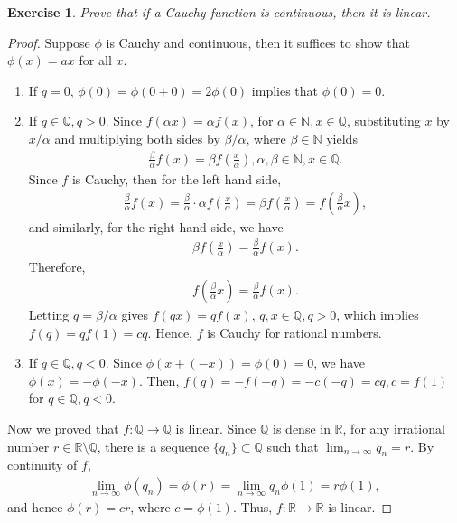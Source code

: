 \documentclass[11pt]{book}
\newtheorem{exercise}{Exercise}[section]
\theoremstyle{definition}
\numberwithin{equation}{chapter}
\begin{document}
\begin{exercise}\label{exercise_529}
Prove that if a Cauchy function is continuous, then it is linear.
\end{exercise}
\begin{proof}
Suppose $\phi$ is Cauchy and continuous, then it suffices to show that $\phi(x) = ax$ for all $x$. 
\begin{enumerate}[label=(\alph*)]
    \item If $q = 0$, $\phi(0) = \phi(0 + 0) = 2 \phi(0)$ implies that $\phi(0) = 0$.
    
    \item If $q \in \mathbb{Q}, q > 0$. Since $f(\alpha x) = \alpha f(x)$, for $\alpha \in \mathbb{N}, x \in \mathbb{Q}$, substituting $x$ by $x/\alpha$ and multiplying both sides by $\beta/\alpha$, where $\beta \in \mathbb{N}$ yields
    \begin{align*}
        \frac{\beta}{\alpha} f(x) = \beta f\left(\frac{x}{\alpha}\right), \alpha,\beta \in \mathbb{N}, x \in \mathbb{Q}.
    \end{align*}
    Since $f$ is Cauchy, then for the left hand side, \begin{align*}
        \frac{\beta}{\alpha} f(x) = \frac{\beta}{\alpha} \cdot \alpha f\left(\frac{x}{\alpha}\right) = \beta f\left(\frac{x}{\alpha}\right) = f\left(\frac{\beta}{\alpha} x\right),
    \end{align*}
    and similarly, for the right hand side, we have
    \begin{align*}
        \beta f\left(\frac{x}{\alpha}\right) = \frac{\beta}{\alpha} f(x).
    \end{align*}
    Therefore,
    \begin{align*}
        f\left(\frac{\beta}{\alpha} x\right) = \frac{\beta}{\alpha} f(x).
    \end{align*}
    Letting $q = \beta/\alpha$ gives $f(qx) = qf(x)$, $q, x \in \mathbb{Q}, q > 0$, which implies $f(q) = qf(1) = cq$. Hence, $f$ is Cauchy for rational numbers.
    
    \item If $q \in \mathbb{Q}, q < 0$. Since $\phi(x+(-x)) = \phi(0) = 0$, we have $\phi(x) = - \phi(-x)$. Then, $f(q) = - f(-q) = -c(-q) = cq, c = f(1)$ for $q \in \mathbb{Q}, q < 0$.
\end{enumerate}

Now we proved that $f: \mathbb{Q} \to \mathbb{Q}$ is linear. Since $\mathbb{Q}$ is dense in $\mathbb{R}$, for any irrational number $r \in \mathbb{R} \setminus \mathbb{Q}$, there is a sequence $\{q_n\} \subset \mathbb{Q}$ such that $\lim_{n\to\infty} q_n = r$. By continuity of $f$,
\begin{align*}
    \lim_{n\to\infty} \phi(q_n) = \phi(r) = \lim_{n\to\infty} q_n \phi(1) = r \phi(1),
\end{align*}
and hence $\phi(r) = cr$, where $c = \phi(1)$. Thus, $f: \mathbb{R} \to \mathbb{R}$ is linear.
\end{proof}
\end{document}
